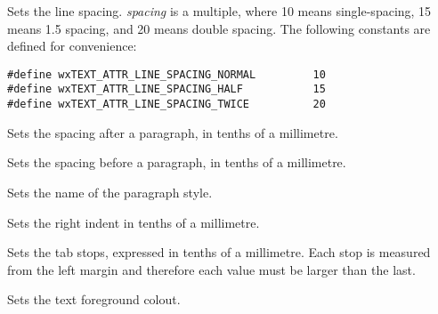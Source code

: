 Sets the line spacing. {\it spacing} is a multiple, where 10 means single-spacing,
15 means 1.5 spacing, and 20 means double spacing. The following constants are
defined for convenience:

{\small
\begin{verbatim}
#define wxTEXT_ATTR_LINE_SPACING_NORMAL         10
#define wxTEXT_ATTR_LINE_SPACING_HALF           15
#define wxTEXT_ATTR_LINE_SPACING_TWICE          20
\end{verbatim}
}

\label{wxrichtextattrsetparagraphspacingafter}


Sets the spacing after a paragraph, in tenths of a millimetre.

\label{wxrichtextattrsetparagraphspacingbefore}


Sets the spacing before a paragraph, in tenths of a millimetre.

\label{wxrichtextattrsetparagraphstylename}


Sets the name of the paragraph style.

\label{wxrichtextattrsetrightindent}


Sets the right indent in tenths of a millimetre.

\label{wxrichtextattrsettabs}


Sets the tab stops, expressed in tenths of a millimetre.
Each stop is measured from the left margin and therefore each value must be larger than the last.

\label{wxrichtextattrsettextcolour}


Sets the text foreground colout.

\label{wxrichtextattroperatorassign}

